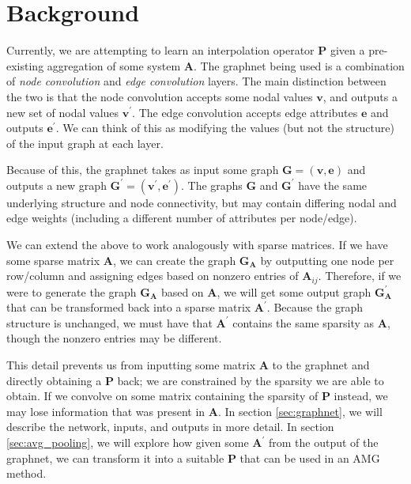 \documentclass{article}
\newcommand{\mat}[1]{\bm{{#1}}}
\renewcommand{\vec}[1]{\bm{{#1}}}
\begin{document}
\section{Background}\label{sec:background}
Currently, we are attempting to learn an interpolation operator $\mat{P}$ given a pre-existing aggregation of some system $\mat{A}$.  The graphnet being used is a combination of \textit{node convolution} and \textit{edge convolution} layers.  The main distinction between the two is that the node convolution accepts some nodal values $\vec{v}$, and outputs a new set of nodal values $\vec{v}^\prime$.  The edge convolution accepts edge attributes $\vec{e}$ and outputs $\vec{e}^\prime$.  We can think of this as modifying the values (but not the structure) of the input graph at each layer.

Because of this, the graphnet takes as input some graph $\mat{G} = \left(\vec{v}, \vec{e}\right)$ and outputs a new graph $\mat{G}^\prime = \left(\vec{v}^\prime, \vec{e}^\prime\right)$.  The graphs $\mat{G}$ and $\mat{G}^\prime$ have the same underlying structure and node connectivity, but may contain differing nodal and edge weights (including a different number of attributes per node/edge).

We can extend the above to work analogously with sparse matrices.  If we have some sparse matrix $\mat{A}$, we can create the graph $\mat{G}_{\mat{A}}$ by outputting one node per row/column and assigning edges based on nonzero entries of $\mat{A}_{ij}$.  Therefore, if we were to generate the graph $\mat{G}_{\mat{A}}$ based on $\mat{A}$, we will get some output graph $\mat{G}_{\mat{A}}^\prime$ that can be transformed back into a sparse matrix $\mat{A}^\prime$.  Because the graph structure is unchanged, we must have that $\mat{A}^\prime$ contains the same sparsity as $\mat{A}$, though the nonzero entries may be different.

This detail prevents us from inputting some matrix $\mat{A}$ to the graphnet and directly obtaining a $\mat{P}$ back; we are constrained by the sparsity we are able to obtain.  If we convolve on some matrix containing the sparsity of $\mat{P}$ instead, we may lose information that was present in $\mat{A}$.  In section \ref{sec:graphnet}, we will describe the network, inputs, and outputs in more detail.  In section \ref{sec:avg_pooling}, we will explore how given some $\mat{A}^\prime$ from the output of the graphnet, we can transform it into a suitable $\mat{P}$ that can be used in an AMG method.
\end{document}
